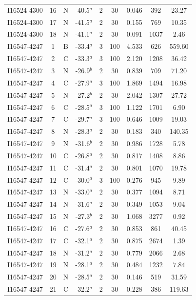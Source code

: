 \begin{table}
\begin{tabular}{ccccccccc}
I16524-4300 & 16 & N & -40.5$^{a}$ & 2 & 30 & 0.046 & 392 & 23.27 \\
I16524-4300 & 17 & N & -41.5$^{a}$ & 2 & 30 & 0.155 & 769 & 10.35 \\
I16524-4300 & 18 & N & -41.1$^{a}$ & 2 & 30 & 0.091 & 1037 & 2.46 \\
I16547-4247 & 1 & B & -33.4$^{a}$ & 3 & 100 & 4.533 & 626 & 559.60 \\
I16547-4247 & 2 & C & -33.3$^{a}$ & 3 & 100 & 2.120 & 1208 & 36.42 \\
I16547-4247 & 3 & N & -26.9$^{b}$ & 2 & 30 & 0.839 & 709 & 71.20 \\
I16547-4247 & 4 & C & -27.9$^{a}$ & 3 & 100 & 1.869 & 1494 & 16.98 \\
I16547-4247 & 5 & N & -27.2$^{b}$ & 2 & 30 & 2.042 & 1307 & 27.72 \\
I16547-4247 & 6 & C & -28.5$^{a}$ & 3 & 100 & 1.122 & 1701 & 6.90 \\
I16547-4247 & 7 & C & -29.7$^{a}$ & 3 & 100 & 0.646 & 1009 & 19.03 \\
I16547-4247 & 8 & N & -28.3$^{a}$ & 2 & 30 & 0.183 & 340 & 140.35 \\
I16547-4247 & 9 & N & -31.6$^{b}$ & 2 & 30 & 0.986 & 1728 & 5.78 \\
I16547-4247 & 10 & C & -26.8$^{a}$ & 2 & 30 & 0.817 & 1408 & 8.86 \\
I16547-4247 & 11 & C & -31.4$^{a}$ & 2 & 30 & 0.801 & 1070 & 19.78 \\
I16547-4247 & 12 & C & -30.0$^{a}$ & 3 & 100 & 0.276 & 945 & 9.89 \\
I16547-4247 & 13 & N & -33.0$^{a}$ & 2 & 30 & 0.377 & 1094 & 8.71 \\
I16547-4247 & 14 & N & -31.6$^{a}$ & 2 & 30 & 0.349 & 1053 & 9.04 \\
I16547-4247 & 15 & N & -27.3$^{b}$ & 2 & 30 & 1.068 & 3277 & 0.92 \\
I16547-4247 & 16 & C & -27.6$^{a}$ & 2 & 30 & 0.853 & 861 & 40.45 \\
I16547-4247 & 17 & C & -32.1$^{a}$ & 2 & 30 & 0.875 & 2674 & 1.39 \\
I16547-4247 & 18 & N & -31.2$^{a}$ & 2 & 30 & 0.779 & 2066 & 2.68 \\
I16547-4247 & 19 & N & -28.1$^{a}$ & 2 & 30 & 0.484 & 1232 & 7.84 \\
I16547-4247 & 20 & N & -28.5$^{a}$ & 2 & 30 & 0.146 & 519 & 31.59 \\
I16547-4247 & 21 & C & -32.2$^{a}$ & 2 & 30 & 0.228 & 386 & 119.63 \\

\end{tabular}
\end{table}

